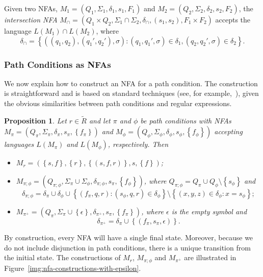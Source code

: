 \documentclass{article}
\newtheorem{proposition}{Proposition}
\newcommand{\set}[1]{\ensuremath{\left\{#1\right\}}} \newcommand{\setO}[1]{\ensuremath{\left\{#1\right.}} \newcommand{\setC}[1]{\ensuremath{\left.#1\right\}}} \newcommand{\setN}[1]{\ensuremath{\left.#1\right.}} \newcommand{\sett}[1]{\ensuremath{\left\{\textit{#1}\right\}}} \newcommand{\tuple}[1]{\ensuremath{\left(#1\right)}} \newcommand{\tuplet}[1]{\ensuremath{\left(\textit{#1}\right)}} \newcommand{\card}[1]{\left| #1 \right|}
\newcommand{\RcoR}{\ensuremath{\widetilde{R}}} \newcommand{\entity}[1]{\ensuremath{#1}} \newcommand{\rel}[1]{\ensuremath{#1}} \newcommand{\relw}[1]{\textsf{#1}} \newcommand{\comp}{\mathbin{;}} \newcommand{\relpc}[1]{\textsf{#1}} \newcommand{\princ}[1]{\textsf{#1}} \newcommand{\ppmc}{\ensuremath{\phi}} \newcommand{\npmc}{\ensuremath{\psi}} \newcommand{\pmp}{\ensuremath{\rho}} \newcommand{\act}[1]{\textsf{#1}} \newcommand{\crs}{\ensuremath{\chi}} \newcommand{\crso}[1]{\textsf{#1}} \newcommand{\defo}[1]{#1} \newcommand{\mpalg}{\textsf{MatchPrincipal}\xspace} \renewcommand{\algorithmiccomment}[1]{// #1} \newcommand{\audita}[1]{\ensuremath{#1^\oplus}}
\begin{document}
Given two NFAs, \mbox{$M_1 = (Q_1, \Sigma_1, \delta_1, s_1, F_1)$} and \mbox{$M_2 = (Q_2, \Sigma_2, \delta_2, s_2, F_2)$}, the \emph{intersection NFA} \mbox{$M_\cap = (Q_1 \times Q_2, \Sigma_1 \cap \Sigma_2, \delta_\cap, (s_1, s_2), F_1 \times F_2)$} accepts the language $L(M_1) \cap L(M_2)$, where
\[
\delta_\cap = \set{((q_1,q_2),(q_1',q_2'),\sigma) : (q_1,q_1',\sigma) \in \delta_1, (q_2,q_2',\sigma) \in \delta_2}.
\]

\subsubsection{Path Conditions as NFAs}

We now explain how to construct an NFA for a path condition.
The construction is straightforward and is based on standard techniques (see, for example,~\cite{Aho_Compilers}), given the obvious similarities between path conditions and regular expressions.

\begin{proposition}
Let $r \in \RcoR$ and let $\pi$ and $\phi$ be path conditions with NFAs $M_{\pi} = (Q_\pi,\Sigma_\pi,\delta_\pi,s_\pi,\set{f_\pi})$ and $M_{\phi}  = (Q_\phi,\Sigma_\phi,\delta_\phi,s_\phi,\set{f_\phi})$ accepting languages $L(M_\pi)$ and $L(M_\phi)$, respectively. Then \begin{itemize}
 \item \mbox{$M_r = (\set{s,f}, \set{r}, \set{(s,f,r)}, s, \set{f})$};
 \item $M_{\pi \comp \phi} = (Q_{\pi \comp \phi},\Sigma_\pi \cup \Sigma_\phi,\delta_{\pi \comp \phi},s_\pi,\set{f_\phi})$, where $Q_{\pi \comp \phi} = Q_\pi \cup Q_\phi \setminus \set{s_\phi}$ and \[ \delta_{\pi \comp \phi} = \delta_\pi \cup \delta_\phi \cup \set{(f_\pi,q,r) : (s_\phi,q,r) \in \delta_\phi} \setminus \set{(x,y,z) \in \delta_\phi : x = s_\phi}; \]
 \item \mbox{$M_{\pi^+} = (Q_\pi,\Sigma_\pi \cup \set{\epsilon},\delta_{\pi^+},s_\pi,\set{f_\pi})$}, where $\epsilon$ is the empty symbol and \[ \delta_{\pi^+} = \delta_\pi \cup \set{(f_\pi,s_\pi,\epsilon)}. \]
\end{itemize}
\end{proposition}

By construction, every NFA will have a single final state.
Moreover, because we do not include disjunction in path conditions, there is a unique transition from the initial state.
The constructions of $M_r$, $M_{\pi \comp \phi}$ and $M_{\pi^+}$ are illustrated in Figure~\ref{img:nfa-constructions-with-epsilon}.
\end{document}
